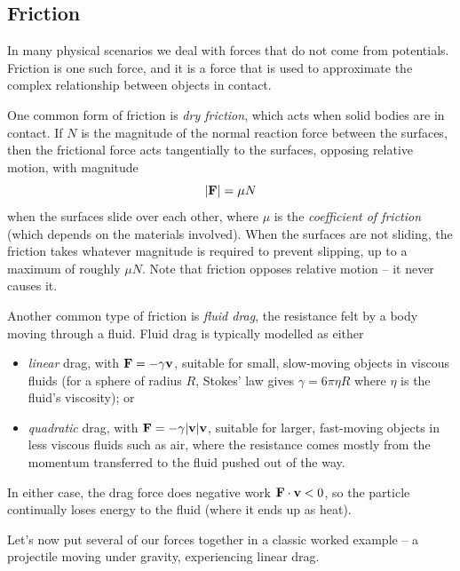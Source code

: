 \documentclass[a4paper]{scrartcl}
\begin{document}
\subsection{Friction}

In many physical scenarios we deal with forces that do not come from potentials. Friction is one such force, and it is a force that is used to approximate the complex relationship between objects in contact.

One common form of friction is \emph{dry friction}, which acts when solid bodies are in contact. If $N$ is the magnitude of the normal reaction force between the surfaces, then the frictional force acts tangentially to the surfaces, opposing relative motion, with magnitude
$$
|\mathbf{F}| = \mu N
$$
when the surfaces slide over each other, where $\mu$ is the \emph{coefficient of friction} (which depends on the materials involved). When the surfaces are not sliding, the friction takes whatever magnitude is required to prevent slipping, up to a maximum of roughly $\mu N$. Note that friction opposes relative motion -- it never causes it.

Another common type of friction is \emph{fluid drag}, the resistance felt by a body moving through a fluid. Fluid drag is typically modelled as either
\begin{itemize}
	\item \emph{linear} drag, with $\mathbf{F} = - \gamma \mathbf{v}$, suitable for small, slow-moving objects in viscous fluids (for a sphere of radius $R$, Stokes' law gives $\gamma = 6\pi \eta R$ where $\eta$ is the fluid's viscosity); or
	\item \emph{quadratic} drag, with $\mathbf{F} = - \gamma |\mathbf{v}| \mathbf{v}$, suitable for larger, fast-moving objects in less viscous fluids such as air, where the resistance comes mostly from the momentum transferred to the fluid pushed out of the way.
\end{itemize}
In either case, the drag force does negative work $\mathbf{F} \cdot \mathbf{v} < 0$, so the particle continually loses energy to the fluid (where it ends up as heat).

Let's now put several of our forces together in a classic worked example -- a projectile moving under gravity, experiencing linear drag.
\end{document}
